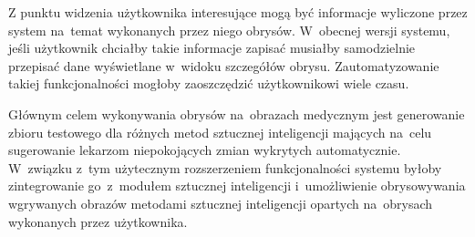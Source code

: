 \documentclass[a4paper,11pt,twoside,openright]{report}
\theoremstyle{definition}
\begin{document}
Z punktu widzenia użytkownika interesujące mogą być informacje wyliczone przez
system na~temat wykonanych przez niego obrysów. W~obecnej wersji systemu, jeśli
użytkownik chciałby takie informacje zapisać musiałby samodzielnie przepisać dane
wyświetlane w~widoku szczegółów obrysu. Zautomatyzowanie takiej funkcjonalności
mogłoby zaoszczędzić użytkownikowi wiele czasu.

Głównym celem wykonywania obrysów na~obrazach medycznym jest generowanie zbioru
testowego dla różnych metod sztucznej inteligencji mających na~celu sugerowanie
lekarzom niepokojących zmian wykrytych automatycznie. W~związku z~tym użytecznym
rozszerzeniem funkcjonalności systemu byłoby zintegrowanie go~z~modułem sztucznej
inteligencji i~umożliwienie obrysowywania wgrywanych obrazów metodami sztucznej
inteligencji opartych na~obrysach wykonanych przez użytkownika.




\end{document}

